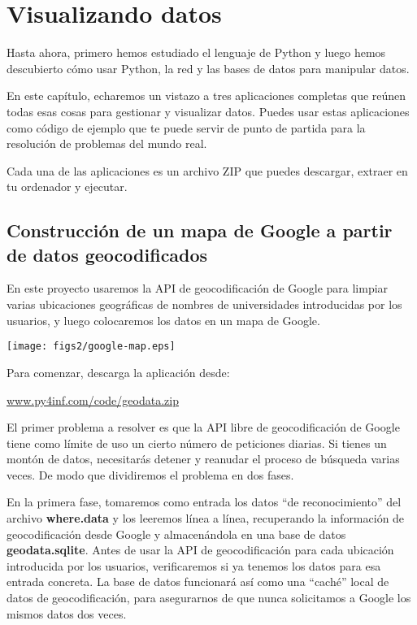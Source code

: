 
\chapter{Visualizando datos}

Hasta ahora, primero hemos estudiado el lenguaje de Python y luego
hemos descubierto cómo usar Python, la red y las bases de datos
para manipular datos.

En este capítulo, echaremos un vistazo a tres
aplicaciones completas que reúnen todas esas cosas
para gestionar y visualizar datos. Puedes usar estas aplicaciones
como código de ejemplo que te puede servir de punto de partida para la
resolución de problemas del mundo real.

Cada una de las aplicaciones es un archivo ZIP que puedes descargar,
extraer en tu ordenador y ejecutar.

\section{Construcción de un mapa de Google a partir de datos geocodificados}

En este proyecto usaremos la API de geocodificación de Google
para limpiar varias ubicaciones geográficas de nombres de universidades
introducidas por los usuarios, y luego colocaremos los datos en
un mapa de Google. 

\beforefig
\centerline{\texttt{[image: figs2/google-map.eps]}}
\afterfig

Para comenzar, descarga la aplicación desde:

\url{www.py4inf.com/code/geodata.zip}

El primer problema a resolver es que la API libre de geocodificación
de Google tiene como límite de uso un cierto número de peticiones diarias. Si tienes
un montón de datos, necesitarás detener y reanudar el proceso de
búsqueda varias veces. De modo que dividiremos el problema en
dos fases.

En la primera fase, tomaremos como entrada los datos ``de reconocimiento'' del archivo
{\bf where.data} y los leeremos línea a línea, recuperando la
información de geocodificación desde Google y almacenándola
en una base de datos {\bf geodata.sqlite}.
Antes de usar la API de geocodificación para cada ubicación introducida por los usuarios,
verificaremos si ya tenemos los datos para esa entrada
concreta. La base de datos funcionará así como una ``caché'' local
de datos de geocodificación, para asegurarnos de que nunca solicitamos
a Google los mismos datos dos veces.

